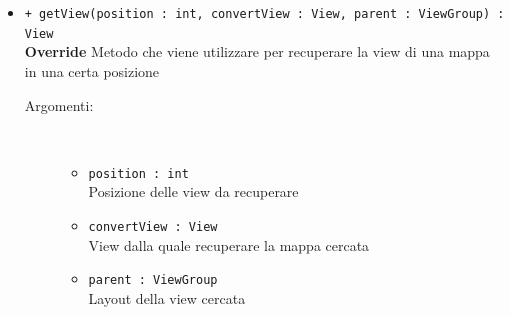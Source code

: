 \documentclass[../DefinizioneDiProdotto.tex]{subfiles}
\begin{document}
\begin{description}
\begin{itemize}
\begin{description}
		\end{description}
		\item \texttt{+ getView(position : int, convertView : View, parent : ViewGroup) : View}\\
		\textbf{Override} Metodo che viene utilizzare per recuperare la view di una mappa in una certa posizione
		\begin{description}
			\item[Argomenti:] \
			\begin{itemize}
				\item \texttt{position : int}\\
				Posizione delle view da recuperare\item \texttt{convertView : View}\\
				View dalla quale recuperare la mappa cercata	\item \texttt{parent : ViewGroup}\\
				Layout della view cercata\end{itemize}
		\end{description}
	\end{itemize}
\end{description}
\end{document}

